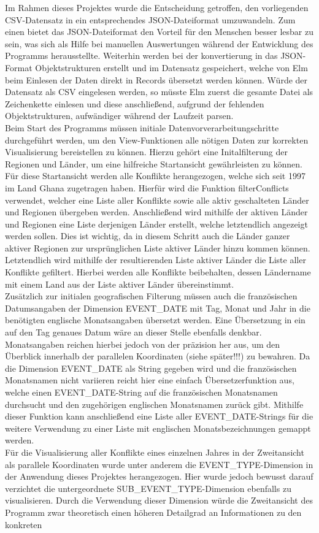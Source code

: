 \documentclass[usegeometry=true]{scrartcl}
\begin{document}
Im Rahmen dieses Projektes wurde die Entscheidung getroffen, den vorliegenden CSV-Datensatz in ein entsprechendes JSON-Dateiformat umzuwandeln. Zum einen bietet das JSON-Dateiformat den Vorteil für den Menschen besser lesbar zu sein, was sich als Hilfe bei manuellen Auswertungen während der Entwicklung des Programms herausstellte. Weiterhin werden bei der konvertierung in das JSON-Format Objektstrukturen erstellt und im Datensatz gespeichert, welche von Elm beim Einlesen der Daten direkt in Records übersetzt werden können. Würde der Datensatz als CSV eingelesen werden, so müsste Elm zuerst die gesamte Datei als Zeichenkette einlesen und diese anschließend, aufgrund der fehlenden Objektstrukturen, aufwändiger während der Laufzeit parsen.\\ Beim Start des Programms müssen initiale Datenvorverarbeitungschritte durchgeführt werden, um den View-Funktionen alle nötigen Daten zur korrekten Visualisierung bereistellen zu können. Hierzu gehört eine Initalfilterung der Regionen und Länder, um eine hilfreiche Startansicht gewährleisten zu können. Für diese Startansicht werden alle Konflikte herangezogen, welche sich seit 1997 im Land Ghana zugetragen haben. Hierfür wird die Funktion filterConflicts verwendet, welcher eine Liste aller Konflikte sowie alle aktiv geschalteten Länder und Regionen übergeben werden. Anschließend wird mithilfe der aktiven Länder und Regionen eine Liste derjenigen Länder erstellt, welche letztendlich angezeigt werden sollen. Dies ist wichtig, da in diesem Schritt auch die Länder ganzer aktiver Regionen zur ursprünglichen Liste aktiver Länder hinzu kommen können. Letztendlich wird mithilfe der resultierenden Liste aktiver Länder die Liste aller Konflikte gefiltert. Hierbei werden alle Konflikte beibehalten, dessen Ländername mit einem Land aus der Liste aktiver Länder übereinstimmt.\\ Zusätzlich zur initialen geografischen Filterung müssen auch die französischen Datumsangaben der Dimension EVENT\_DATE mit Tag, Monat und Jahr in die benötigten englische Monatsangaben übersetzt werden. Eine Übersetzung in ein auf den Tag genaues Datum wäre an dieser Stelle ebenfalls denkbar. Monatsangaben reichen hierbei jedoch von der präzision her aus, um den Überblick innerhalb der parallelen Koordinaten (siehe später!!!) zu bewahren. Da die Dimension EVENT\_DATE als String gegeben wird und die französischen Monatsnamen nicht variieren reicht hier eine einfach Übersetzerfunktion aus, welche einen EVENT\_DATE-String auf die französischen Monatsnamen durchsucht und den zugehörigen englischen Monatsnamen zurück gibt. Mithilfe dieser Funktion kann anschließend eine Liste aller EVENT\_DATE-Strings für die weitere Verwendung zu einer Liste mit englischen Monatsbezeichnungen gemappt werden.\\ Für die Visualisierung aller Konflikte eines einzelnen Jahres in der Zweitansicht als parallele Koordinaten wurde unter anderem die EVENT\_TYPE-Dimension in der Anwendung dieses Projektes herangezogen. Hier wurde jedoch bewusst darauf verzichtet die untergeordnete SUB\_EVENT\_TYPE-Dimension ebenfalls zu visualisieren. Durch die Verwendung dieser Dimension würde die Zweitansicht des Programm zwar theoretisch einen höheren Detailgrad an Informationen zu den konkreten 
\end{document}
